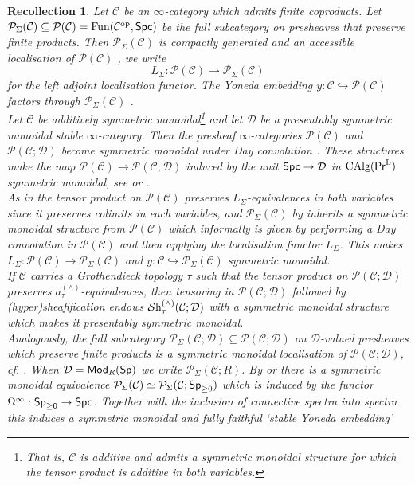 \documentclass[reqno]{amsart}
\numberwithin{equation}{section}\theoremstyle{thms}
\theoremstyle{defn}
\newtheorem{rec}[equation]{Recollection}
\newcommand{\cC}{\mathcal{C}}
\newcommand{\cD}{\mathcal{D}}
\newcommand{\cP}{\mathcal{P}}
\newcommand{\tn}[1]{\textnormal{#1}}
\newcommand{\tsf}[1]{\textsf{\textup{#1}}}
\newcommand{\mcal}[1]{\mathcal{#1}}
\newcommand{\op}{\tn{op}}
\newcommand{\fun}{\tn{Fun}}
\newcommand{\psigma}{\cP_{\Sigma}}
\newcommand{\sheaves}{\mcal{S}\tn{h}}
\newcommand{\calg}{\tn{CAlg}}
\newcommand{\Mod}{\tsf{Mod}}
\newcommand{\spec}{\tsf{Sp}}
\newcommand{\spc}{\tsf{Spc}}
\newcommand{\prl}{\tsf{Pr}^{\tn{L}}}
\begin{document}
\begin{rec}\label{rec:psigma}
Let $\cC$ be an $\infty$-category which admits finite coproducts. Let $\psigma(\cC) \subseteq \cP(\cC) = \fun(\cC^{\op},\spc)$ be the full subcategory on presheaves that preserve finite products. Then $\psigma(\cC)$ is compactly generated \cite[Proposition 5.5.8.10(6)]{lur09} and an accessible localisation of $\cP(\cC)$ \cite[Proposition 5.5.8.10(1)]{lur09}, we write 
$$L_{\Sigma}: \cP(\cC) \to \psigma(\cC)$$
for the left adjoint localisation functor. The Yoneda embedding $y: \cC \hookrightarrow \cP(\cC)$ factors through $\psigma(\cC)$ \cite[Proposition 5.5.8.10(2)]{lur09}. \\
Let $\cC$ be additively symmetric monoidal\footnote{That is, $\cC$ is additive and admits a symmetric monoidal structure for which the tensor product is additive in both variables.} and let $\cD$ be a presentably symmetric monoidal stable $\infty$-category. Then the presheaf $\infty$-categories $\cP(\cC)$ and $\cP(\cC;\cD)$ become symmetric monoidal under Day convolution \cite[§2.2.6, 4.8.1]{lur17}. These structures make the map $\cP(\cC) \to \cP(\cC;\cD)$ induced by the unit $\spc \to \cD$ in $\calg(\prl)$ symmetric monoidal, see \cite[Corollary 3.7]{nik16} or \cite[Proposition 3.3]{bs24}. \\
As in \cite[Lemma 3.7]{bgs20} the tensor product on $\cP(\cC)$ preserves $L_{\Sigma}$-equivalences in both variables since it preserves colimits in each variables, and $\psigma(\cC)$ by \cite[Proposition 2.2.1.9]{lur17} inherits a symmetric monoidal structure from $\cP(\cC)$ which informally is given by performing a Day convolution in $\cP(\cC)$ and then applying the localisation functor $L_{\Sigma}$. This makes $L_{\Sigma}: \cP(\cC) \to \psigma(\cC)$ and $y: \cC \hookrightarrow \psigma(\cC)$ symmetric monoidal.\\
If $\cC$ carries a Grothendieck topology $\tau$ such that the tensor product on $\cP(\cC;\cD)$ preserves $a^{(\wedge)}_{\tau}$-equivalences, then tensoring in $\cP(\cC;\cD)$ followed by (hyper)sheafification endows $\sheaves^{(\wedge)}_{\tau}(\cC; \cD)$ with a symmetric monoidal structure which makes it presentably symmetric monoidal. \\
Analogously, the full subcategory $\psigma(\cC;\cD) \subseteq \cP(\cC;\cD)$ on $\cD$-valued presheaves which preserve finite products is a symmetric monoidal localisation of $\cP(\cC;\cD)$, cf. \cite[Remark 2.10]{aok20}. When $\cD = \Mod_R(\spec)$ we write $\psigma(\cC;R)$. By \cite[Corollary 2.10(iii), Example 5.3(ii)]{ggn15} or \cite[Proposition C.1.5.7]{lur18} there is a symmetric monoidal equivalence $\psigma(\cC) \simeq \psigma(\cC;\spec_{\geq 0})$ which is induced by the functor $\Omega^{\infty}: \spec_{\geq 0} \to \spc$. Together with the inclusion of connective spectra into spectra this induces a symmetric monoidal and fully faithful `stable Yoneda embedding'

\end{rec}
\end{document}
